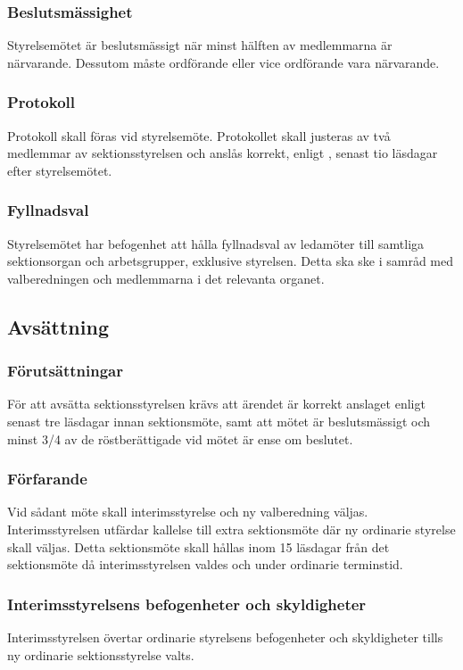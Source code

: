 \subsubsection{Beslutsmässighet}
Styrelsemötet är beslutsmässigt när minst hälften av medlemmarna är närvarande. Dessutom måste ordförande eller vice ordförande vara närvarande.

\subsubsection{Protokoll}
Protokoll skall föras vid styrelsemöte. Protokollet skall justeras av två medlemmar av sektionsstyrelsen och anslås korrekt, enligt , senast tio läsdagar efter styrelsemötet.

\subsubsection{Fyllnadsval}
Styrelsemötet har befogenhet att hålla fyllnadsval av ledamöter till samtliga sektionsorgan och arbetsgrupper, exklusive styrelsen. Detta ska ske i samråd med valberedningen och medlemmarna i det relevanta organet.

\subsection{Avsättning}

\subsubsection{Förutsättningar}
För att avsätta sektionsstyrelsen krävs att ärendet är korrekt anslaget enligt  senast tre läsdagar innan sektionsmöte, samt att mötet är beslutsmässigt och minst 3/4 av de röstberättigade vid mötet är ense om beslutet. 

\subsubsection{Förfarande}
Vid sådant möte skall interimsstyrelse och ny valberedning väljas. Interimsstyrelsen utfärdar kallelse till extra sektionsmöte där ny ordinarie styrelse skall väljas. Detta sektionsmöte skall hållas inom 15 läsdagar från det sektionsmöte då interimsstyrelsen valdes och under ordinarie terminstid.

\subsubsection{Interimsstyrelsens befogenheter och skyldigheter}
Interimsstyrelsen övertar ordinarie styrelsens befogenheter och skyldigheter tills ny ordinarie sektionsstyrelse valts.


